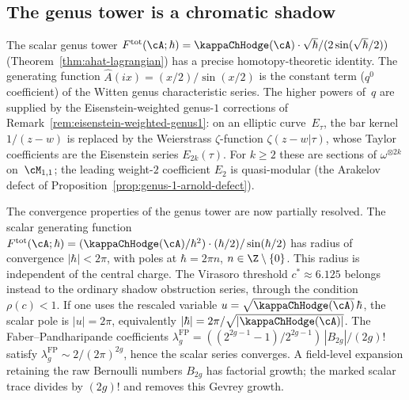 \subsection{The genus tower is a chromatic shadow}

The scalar genus tower
$F^{\mathrm{tot}}(\cA;\hbar)
= \kappaChHodge(\cA) \cdot \sqrt{\hbar}/(2\sin(\sqrt{\hbar}/2))$
(Theorem~\ref{thm:ahat-lagrangian})
has a precise homotopy-theoretic identity.
The generating function $\hat{A}(ix) = (x/2)/\sin(x/2)$
is the constant term ($q^0$ coefficient) of the
Witten genus characteristic series.
The higher powers of~$q$ are supplied by
the Eisenstein-weighted genus-$1$ corrections of
Remark~\ref{rem:eisenstein-weighted-genus1}:
on an elliptic curve~$E_\tau$, the bar kernel
$1/(z{-}w)$ is replaced by the Weierstrass
$\zeta$-function $\zeta(z{-}w|\tau)$, whose
Taylor coefficients are the Eisenstein series $E_{2k}(\tau)$.
For $k \ge 2$ these are sections of $\omega^{\otimes 2k}$
on~$\cM_{1,1}$; the leading weight-$2$ coefficient $E_2$
is quasi-modular (the Arakelov defect of
Proposition~\ref{prop:genus-1-arnold-defect}).

The convergence properties of the genus tower are now partially
resolved. The scalar generating function
$F^{\mathrm{tot}}(\cA;\hbar) = (\kappaChHodge(\cA)/\hbar^2) \cdot
(\hbar/2)/\sin(\hbar/2)$ has radius of convergence
$|\hbar| < 2\pi$, with poles at
$\hbar = 2\pi n$, $n \in \Z\setminus\{0\}$. This radius is
independent of the central charge. The Virasoro threshold
$c^* \approx 6.125$ belongs instead to the ordinary shadow
obstruction series, through the condition $\rho(c)<1$. If one
uses the rescaled variable $u=\sqrt{\kappaChHodge(\cA)}\,\hbar$,
the scalar pole is $|u|=2\pi$, equivalently
$|\hbar|=2\pi/\sqrt{|\kappaChHodge(\cA)|}$. The
Faber--Pandharipande coefficients
$\lambda_g^{\mathrm{FP}}=
((2^{2g-1}-1)/2^{2g-1})\,|B_{2g}|/(2g)!$ satisfy
$\lambda_g^{\mathrm{FP}}\sim 2/(2\pi)^{2g}$, hence the scalar
series converges. A field-level expansion retaining the raw
Bernoulli numbers $B_{2g}$ has factorial growth; the marked
scalar trace divides by $(2g)!$ and removes this Gevrey
growth.

